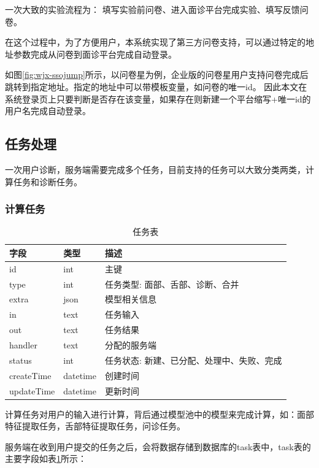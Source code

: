 一次大致的实验流程为： 填写实验前问卷、进入面诊平台完成实验、填写反馈问卷。

在这个过程中，为了方便用户，本系统实现了第三方问卷支持，可以通过特定的地址参数完成从问卷到面诊平台完成自动登录。

如图\ref{fig:wjx-ssojump}所示，以问卷星为例，企业版的问卷星用户支持问卷完成后跳转到指定地址。指定的地址中可以带模板变量，如问卷的唯一id。
因此本文在系统登录页上只要判断是否存在该变量，如果存在则新建一个平台缩写+唯一id的用户名完成自动登录。


\subsection{任务处理}
一次用户诊断，服务端需要完成多个任务，目前支持的任务可以大致分类两类，计算任务和诊断任务。


\subsubsection{计算任务}
\begin{table}[]
    \centering
    \caption{任务表}
    \begin{tabular}{lll}
        \toprule
        字段 & 类型 & 描述 \\ 
        \midrule
        id & int & 主键 \\
        type & int & 任务类型: 面部、舌部、诊断、合并 \\ 
        extra & json & 模型相关信息 \\
        in & text & 任务输入 \\
        out & text & 任务结果 \\
        handler & text & 分配的服务端 \\
        status & int & 任务状态: 新建、已分配、处理中、失败、完成 \\
        createTime & datetime & 创建时间 \\
        updateTime & datetime & 更新时间\\
        \bottomrule
    \end{tabular}
    \label{tab:task}
\end{table}
计算任务对用户的输入进行计算，背后通过模型池中的模型来完成计算，如：面部特征提取任务，舌部特征提取任务，问诊任务。

服务端在收到用户提交的任务之后，会将数据存储到数据库的task表中，task表的主要字段如表\ref{tab:task}所示：


